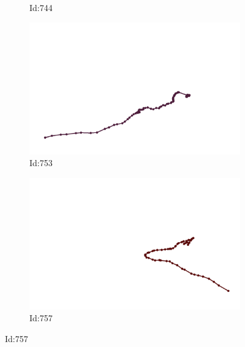 \documentclass[12pt,twoside]{report}
\begin{document}
\begin{figure}
\begin{subfigure}[b]{0.20\textwidth}
\caption{Id:744}
\end{subfigure}
\begin{subfigure}[b]{0.20\textwidth}
\centering
\includegraphics[width=\textwidth]{../../trajectories/753.png}
\caption{Id:753}
\end{subfigure}
\begin{subfigure}[b]{0.20\textwidth}
\centering
\includegraphics[width=\textwidth]{../../trajectories/757.png}
\caption{Id:757}
\end{subfigure}
\end{figure}
\end{document}
